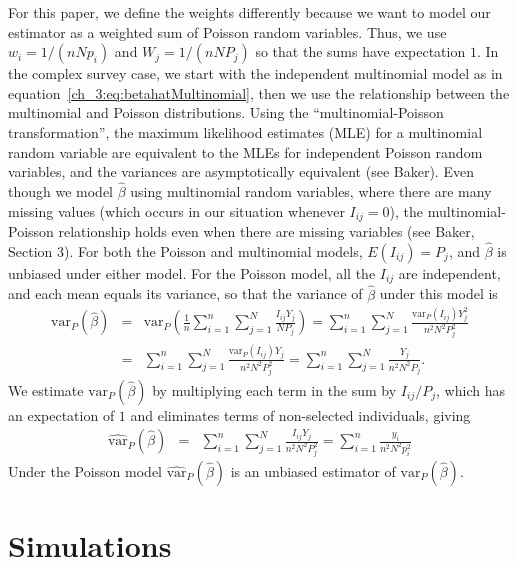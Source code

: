For this paper, we define the weights differently because we want to model our estimator as a weighted sum of Poisson random variables.
Thus, we use $w_i = 1/(nNp_i)$ and $W_j= 1/(nNP_j)$ so that the sums have expectation $1$.
In the complex survey case,
we start with the independent multinomial model as in equation~\ref{ch_3:eq:betahatMultinomial}, then we use the relationship between the multinomial and Poisson distributions.
Using the ``multinomial-Poisson transformation'', the maximum
likelihood estimates (MLE) for a multinomial random variable are equivalent to the MLEs for independent Poisson random variables, and
the variances are asymptotically equivalent (see Baker\cite{Baker:1994}).
Even though we model $\hat{\beta}$ using multinomial random variables, where there are many missing values (which occurs in our situation whenever $I_{ij}=0$),
the multinomial-Poisson relationship holds even when there are missing variables (see Baker\cite{Baker:1994}, Section 3).
For both the Poisson and multinomial models, $E(I_{ij}) = P_j$, and $\hat{\beta}$ is unbiased under either model.
For the Poisson model, all the $I_{ij}$ are independent, and each mean equals its variance, so that the variance of $\hat{\beta}$ under this model is
\begin{eqnarray*}
\textrm{var}_P \left(\hat{\beta} \right) & = & \textrm{var}_P \left( \frac{1}{n} \sum_{i=1}^{n} \sum_{j=1}^{N} \frac{ I_{ij} Y_j}{N P_j} \right)
 = \sum_{i=1}^{n} \sum_{j=1}^{N} \frac{ \textrm{var}_P( I_{ij}) Y_j^2}{n^2 N^2 P_j^2} \\
& = & \sum_{i=1}^{n} \sum_{j=1}^{N} \frac{ \textrm{var}_P( I_{ij}) Y_j}{n^2 N^2 P_j^2}
 =     \sum_{i=1}^{n} \sum_{j=1}^{N} \frac{ Y_j}{n^2 N^2 P_j}.
\end{eqnarray*}
We estimate $\textrm{var}_P \left(\hat{\beta} \right)$ by multiplying each term in the sum by $I_{ij}/P_j$, which has an expectation of $1$ and eliminates terms of non-selected individuals, giving
\begin{eqnarray}
\widehat{\textrm{var}}_P \left(\hat{\beta} \right)
& = & \sum_{i=1}^{n} \sum_{j=1}^{N} \frac{ I_{ij} Y_j}{n^2 N^2 P_j^2} = \sum_{i=1}^{n} \frac{ y_i}{n^2 N^2 p_i^2} \label{ch_3:eq:hatvarbetahat1}
\end{eqnarray}
Under the Poisson model $\widehat{\textrm{var}}_P \left(\hat{\beta} \right)$ is an unbiased estimator of $\textrm{var}_P \left(\hat{\beta} \right)$.



\section{Simulations}

